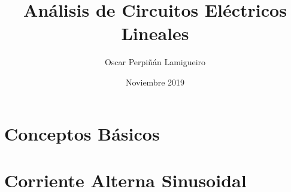 \documentclass[a4paper]{memoir}
\begin{document}
\begin{titlingpage}

  \title{Análisis de Circuitos Eléctricos Lineales}
  \author{Oscar Perpiñán Lamigueiro}
  
  \date{Noviembre 2019}

  \maketitle

\end{titlingpage}

\frontmatter

\cleardoublepage

% 

\tableofcontents

\printnomenclature{}

\cleardoublepage{}

\mainmatter




\part{Conceptos Básicos}
\label{part:conceptos-basicos}








\part{Corriente Alterna Sinusoidal}
\label{part:corriente-alterna}




\backmatter

\printbibliography
\end{document}
